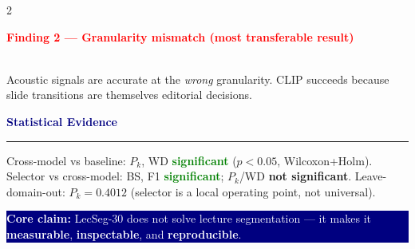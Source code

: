 \documentclass[10pt,a4paper]{article}
\newcommand{\hd}[1]{\medskip\textcolor{navy}{\textbf{\large #1}}\par\noindent\rule{\linewidth}{0.6pt}\smallskip}
\begin{document}
\begin{multicols}{2}
\medskip
\colorbox{red!10}{\parbox{\linewidth}{
\textcolor{red}{\textbf{Finding 2 — Granularity mismatch (most transferable result)}}\\[1pt]
{\footnotesize
{}
}\\[1pt]
Acoustic signals are accurate at the \textit{wrong} granularity.
CLIP succeeds because slide transitions are themselves editorial decisions.
}}

\hd{Statistical Evidence}
{\footnotesize Cross-model vs baseline: $P_k$, WD \textcolor{green}{\textbf{significant}} ($p<0.05$, Wilcoxon+Holm).
Selector vs cross-model: BS, F1 \textcolor{green}{\textbf{significant}}; $P_k$/WD \textcolor{amber}{\textbf{not significant}}.
Leave-domain-out: $P_k=0.4012$ (selector is a local operating point, not universal).}

\end{multicols}

\vspace{-6pt}
\colorbox{navy}{\parbox{\linewidth}{\vspace{3pt}\centering\small
\textcolor{white}{\textbf{Core claim:} LecSeg-30 does not solve lecture segmentation --- it makes it \textbf{measurable}, \textbf{inspectable}, and \textbf{reproducible}.}
\vspace{3pt}}}
\end{document}
